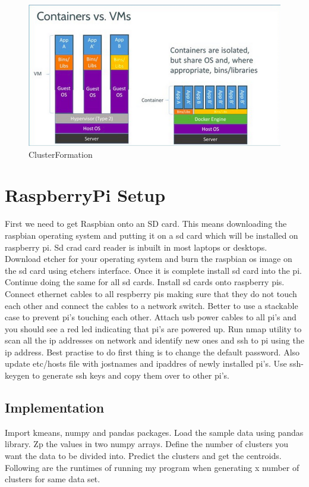 \begin{figure}[!ht]
	\centering\includegraphics[width=\columnwidth]{images/dockervsvm.png}
	 \caption{ClusterFormation}\label{f:clustering}
\end{figure}

\section{RaspberryPi Setup}

First we need to get Raspbian onto an SD card. This means downloading
the raspbian operating system and putting it on a sd card which will
be installed on raspberry pi. Sd crad card reader is inbuilt in most
laptops or desktops. Download etcher for your operating system and
burn the raspbian os image on the sd card using etchers
interface. Once it is complete install sd card into the pi. Continue
doing the same for all sd cards. Install sd cards onto raspberry
pis. Connect ethernet cables to all respberry pis making sure that
they do not touch each other and connect the cables to a network
switch. Better to use a stackable case to prevent pi's touching each
other.  Attach usb power cables to all pi's and you should see a red
led indicating that pi's are powered up. Run nmap utility to scan all
the ip addresses on network and identify new ones and ssh to pi using
the ip address. Best practise to do first thing is to change the
default password. Also update etc/hosts file with jostnames and
ipaddres of newly installed pi's. Use ssh-keygen to generate ssh keys
and copy them over to other pi's.

\subsection{Implementation}

Import kmeans, numpy and pandas packages. Load the sample data using
pandas library. Zp the values in two numpy arrays. Define the number
of clusters you want the data to be divided into. Predict the clusters
and get the centroids. Following are the runtimes of running my
program when generating x number of clusters for same data set.


